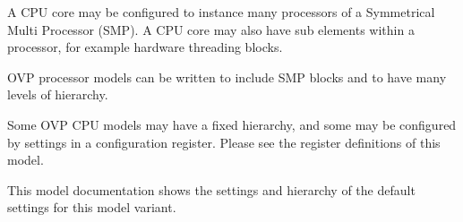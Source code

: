A CPU core may be configured to instance many processors of a Symmetrical
Multi Processor (SMP). A CPU core may also have sub elements within a processor, for
example hardware threading blocks. \par
OVP processor models can be written to include SMP blocks and to have many levels of
hierarchy. \par
Some OVP CPU models may have a fixed hierarchy, and some may be configured by settings
in a configuration register. Please see the register definitions of this model. \par
This model documentation shows the settings and hierarchy of the default settings for this
model variant. \par
